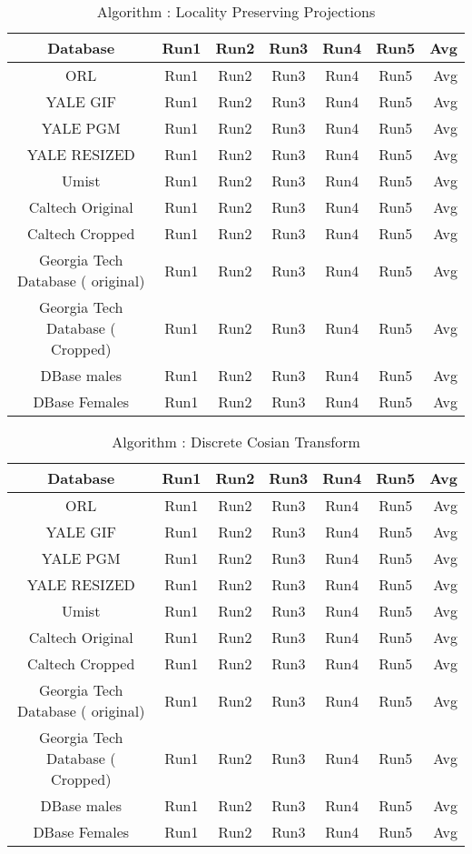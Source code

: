 \documentclass[10pt,a4paper]{article}
\begin{document}
\begin{center}
\begin{table}
\caption{Algorithm : Locality Preserving Projections }
\centering
\begin{tabular}{| c | c | c | c | c | c | r | } \hline 
Database & Run1 & Run2 & Run3 & Run4 & Run5 & Avg  \\  
\hline
ORL & Run1 & Run2 & Run3 & Run4 & Run5 & Avg \\
\hline
YALE GIF & Run1 & Run2 & Run3 & Run4 & Run5 & Avg \\
\hline
YALE PGM & Run1 & Run2 & Run3 & Run4 & Run5 & Avg \\
\hline
YALE RESIZED & Run1 & Run2 & Run3 & Run4 & Run5 & Avg \\
\hline
Umist & Run1 & Run2 & Run3 & Run4 & Run5 & Avg \\
\hline
Caltech Original & Run1 & Run2 & Run3 & Run4 & Run5 & Avg \\
\hline
Caltech Cropped & Run1 & Run2 & Run3 & Run4 & Run5 & Avg \\
\hline
Georgia Tech Database ( original) & Run1 & Run2 & Run3 & Run4 & Run5 & Avg \\
\hline
Georgia Tech Database ( Cropped) & Run1 & Run2 & Run3 & Run4 & Run5 & Avg \\
\hline
DBase males & Run1 & Run2 & Run3 & Run4 & Run5 & Avg \\
\hline
DBase Females  & Run1 & Run2 & Run3 & Run4 & Run5 & Avg \\
\hline
\end{tabular}
\end{table}

\begin{table}
\caption{Algorithm : Discrete Cosian Transform }
\centering
\begin{tabular}{| c | c | c | c | c | c | r | } \hline 
Database & Run1 & Run2 & Run3 & Run4 & Run5 & Avg  \\  
\hline
ORL & Run1 & Run2 & Run3 & Run4 & Run5 & Avg \\
\hline
YALE GIF & Run1 & Run2 & Run3 & Run4 & Run5 & Avg \\
\hline
YALE PGM & Run1 & Run2 & Run3 & Run4 & Run5 & Avg \\
\hline
YALE RESIZED & Run1 & Run2 & Run3 & Run4 & Run5 & Avg \\
\hline
Umist & Run1 & Run2 & Run3 & Run4 & Run5 & Avg \\
\hline
Caltech Original & Run1 & Run2 & Run3 & Run4 & Run5 & Avg \\
\hline
Caltech Cropped & Run1 & Run2 & Run3 & Run4 & Run5 & Avg \\
\hline
Georgia Tech Database ( original) & Run1 & Run2 & Run3 & Run4 & Run5 & Avg \\
\hline
Georgia Tech Database ( Cropped) & Run1 & Run2 & Run3 & Run4 & Run5 & Avg \\
\hline
DBase males & Run1 & Run2 & Run3 & Run4 & Run5 & Avg \\
\hline
DBase Females  & Run1 & Run2 & Run3 & Run4 & Run5 & Avg \\
\hline
\end{tabular}
\end{table}


\end{center}
\end{document}
